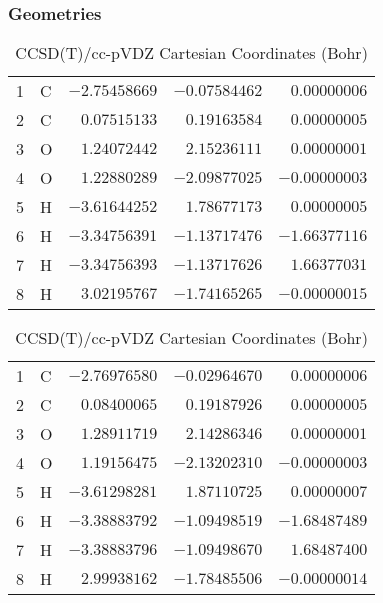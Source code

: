 \documentclass[10pt,oneside]{article}
\begin{document}
\begin{table}[h!]
\subsubsection*{Geometries}
\begin{multicols}{2}
\centering
\caption{CCSD(T)/cc-pVTZ Cartesian Coordinates (Bohr)}
\begin{tabular}{llrrr}
\toprule
1  & C  & $-2.75458669$ & $-0.07584462$ & $ 0.00000006$ \\
2  & C  & $ 0.07515133$ & $ 0.19163584$ & $ 0.00000005$ \\
3  & O  & $ 1.24072442$ & $ 2.15236111$ & $ 0.00000001$ \\
4  & O  & $ 1.22880289$ & $-2.09877025$ & $-0.00000003$ \\
5  & H  & $-3.61644252$ & $ 1.78677173$ & $ 0.00000005$ \\
6  & H  & $-3.34756391$ & $-1.13717476$ & $-1.66377116$ \\
7  & H  & $-3.34756393$ & $-1.13717626$ & $ 1.66377031$ \\
8  & H  & $ 3.02195767$ & $-1.74165265$ & $-0.00000015$ \\
\bottomrule
\end{tabular}
\caption{CCSD(T)/cc-pVDZ Cartesian Coordinates (Bohr)}
\begin{tabular}{llrrr}
\toprule
1  & C  & $-2.76976580$ & $-0.02964670$ & $ 0.00000006$ \\
2  & C  & $ 0.08400065$ & $ 0.19187926$ & $ 0.00000005$ \\
3  & O  & $ 1.28911719$ & $ 2.14286346$ & $ 0.00000001$ \\
4  & O  & $ 1.19156475$ & $-2.13202310$ & $-0.00000003$ \\
5  & H  & $-3.61298281$ & $ 1.87110725$ & $ 0.00000007$ \\
6  & H  & $-3.38883792$ & $-1.09498519$ & $-1.68487489$ \\
7  & H  & $-3.38883796$ & $-1.09498670$ & $ 1.68487400$ \\
8  & H  & $ 2.99938162$ & $-1.78485506$ & $-0.00000014$ \\
\bottomrule
\end{tabular}
\end{multicols}
\end{table}
\end{document}
